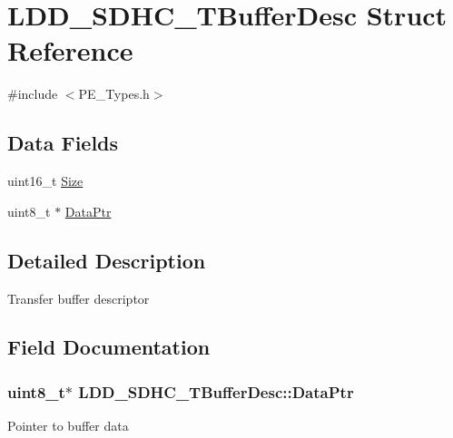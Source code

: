 \hypertarget{struct_l_d_d___s_d_h_c___t_buffer_desc}{}\section{L\+D\+D\+\_\+\+S\+D\+H\+C\+\_\+\+T\+Buffer\+Desc Struct Reference}
\label{struct_l_d_d___s_d_h_c___t_buffer_desc}


{\ttfamily \#include $<$P\+E\+\_\+\+Types.\+h$>$}

\subsection*{Data Fields}
\begin{DoxyCompactItemize}
\item 
uint16\+\_\+t \hyperlink{struct_l_d_d___s_d_h_c___t_buffer_desc_a117f5acff1ada72194a95b38795bca56}{Size}
\item 
uint8\+\_\+t $\ast$ \hyperlink{struct_l_d_d___s_d_h_c___t_buffer_desc_a0349f594a37791792e4a213111173a68}{Data\+Ptr}
\end{DoxyCompactItemize}


\subsection{Detailed Description}
Transfer buffer descriptor 

\subsection{Field Documentation}
\hypertarget{struct_l_d_d___s_d_h_c___t_buffer_desc_a0349f594a37791792e4a213111173a68}{}
\subsubsection[{Data\+Ptr}]{\setlength{\rightskip}{0pt plus 5cm}uint8\+\_\+t$\ast$ L\+D\+D\+\_\+\+S\+D\+H\+C\+\_\+\+T\+Buffer\+Desc\+::\+Data\+Ptr}\label{struct_l_d_d___s_d_h_c___t_buffer_desc_a0349f594a37791792e4a213111173a68}
Pointer to buffer data \hypertarget{struct_l_d_d___s_d_h_c___t_buffer_desc_a117f5acff1ada72194a95b38795bca56}{}
